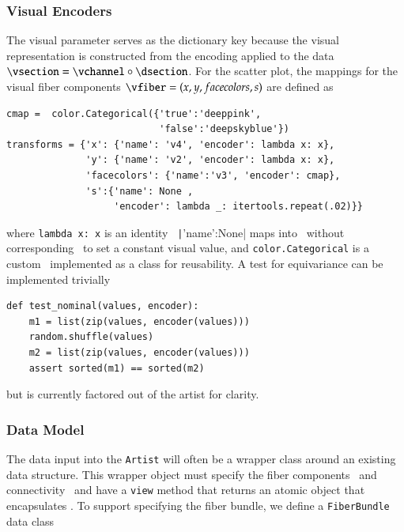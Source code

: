 \documentclass[journal]{vgtc}                %
\begin{document}
\subsubsection{Visual Encoders}
The visual parameter serves as the dictionary key because the visual representation is constructed from the encoding applied to the data  $\vsection = \vchannel \circ \dsection$. For the scatter plot, the mappings for the visual fiber components $\vfiber=(x,y, facecolors, s)$ are defined as
\begin{verbatim}
cmap =  color.Categorical({'true':'deeppink', 
                           'false':'deepskyblue'})
transforms = {'x': {'name': 'v4', 'encoder': lambda x: x},
              'y': {'name': 'v2', 'encoder': lambda x: x},
              'facecolors': {'name':'v3', 'encoder': cmap}, 
              's':{'name': None , 
                   'encoder': lambda _: itertools.repeat(.02)}}
\end{verbatim}

where \texttt{lambda x: x} is an identity \vchannel\, \texttt|{'name':None}| maps into \vfiber\ without corresponding \dsection\ to set a constant visual value, and \texttt{color.Categorical} is a custom \vchannel\ implemented as a class for reusability.  A test for equivariance can be implemented trivially
\begin{verbatim}
def test_nominal(values, encoder):
    m1 = list(zip(values, encoder(values)))
    random.shuffle(values)
    m2 = list(zip(values, encoder(values)))
    assert sorted(m1) == sorted(m2)
\end{verbatim}
but is currently factored out of the artist for clarity. 

\subsubsection{Data Model}
The data input into the \texttt{Artist} will often be a wrapper class around an existing data structure. This wrapper object must specify the fiber components \dfiber\ and connectivity \dbase\ and have a \texttt{view} method that returns an atomic object that encapsulates \dsection. To support specifying the fiber bundle, we define a \texttt{FiberBundle} data class\cite{DataclassesDataClasses}
\end{document}
